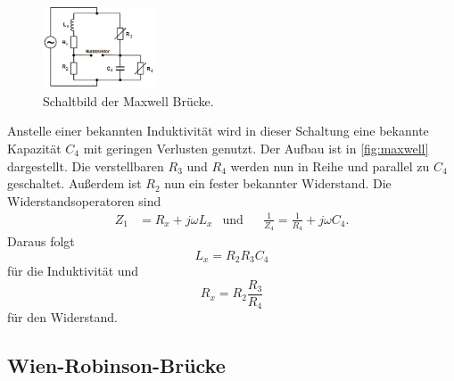 \begin{figure}[H]
    \centering
    \includegraphics[width=0.3\textwidth]{build/maxwell.PNG}
    \caption{Schaltbild der Maxwell Brücke.\cite[222]{V302}}
    \label{fig:maxwell}
\end{figure}
Anstelle einer bekannten Induktivität wird in dieser Schaltung eine bekannte Kapazität $C_4$ mit geringen Verlusten genutzt.
Der Aufbau ist in \autoref{fig:maxwell} dargestellt.
Die verstellbaren $R_3$ und $R_4$ werden nun in Reihe und parallel zu $C_4$ geschaltet.
Außerdem ist $R_2$ nun ein fester bekannter Widerstand.
Die Widerstandsoperatoren sind
\begin{align}
    Z_1 &= R_x + j\omega L_x & \text{und}&  &\frac{1}{Z_4}=\frac{1}{R_4}+j\omega C_4.
    \label{eqn:widerop_max}
\end{align}
Daraus folgt
\begin{equation}
    L_x = R_2 R_3 C_4
    \label{eqn:induktivität_max}
\end{equation}
für die Induktivität und 
\begin{equation}
    R_x = R_2 \frac{R_3}{R_4}
    \label{eqn:widerstand_max}
\end{equation}
für den Widerstand.
\subsection{Wien-Robinson-Brücke}
\label{subsec:wien-robinson}


